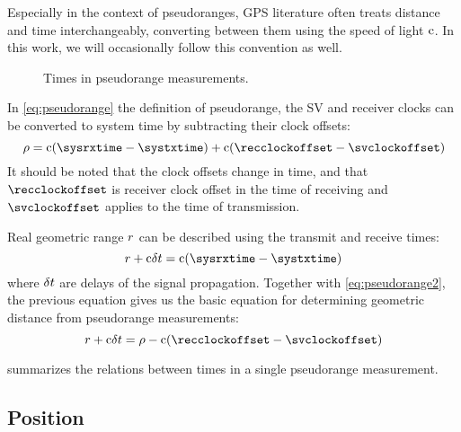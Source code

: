 Especially in the context of pseudoranges, GPS literature often treats distance and time
interchangeably, converting between them using the speed of light \(\mathrm{c}\).
In this work, we will occasionally follow this convention as well.

\begin{figure}[tb]
	\centering
	
	\caption{Times in pseudorange measurements.}
	\label{fig:pseudorange}
\end{figure}

In \eqref{eq:pseudorange} the definition of pseudorange, the SV and receiver clocks can be
converted to system time by subtracting their clock offsets:
\begin{equation}
	\label{eq:pseudorange2}
	\rho = \speedoflight (\sysrxtime - \systxtime) + \speedoflight (\recclockoffset - \svclockoffset)
\end{equation}
It should be noted that the clock offsets change in time, and that \(\recclockoffset\) is receiver clock
offset in the time of receiving and \(\svclockoffset\) applies to the time of transmission.

Real geometric range \(r\) can be described using the transmit and receive times:
\begin{equation}
	\geomrange + \speedoflight\geomrangedelays = \speedoflight (\sysrxtime - \systxtime)
\end{equation}
where \(\delta{t}\) are delays of the signal propagation.
Together with \eqref{eq:pseudorange2}, the previous equation gives us
the basic equation for determining geometric distance from pseudorange measurements:
\begin{equation}
	\geomrange + \speedoflight\geomrangedelays = \rho - \speedoflight (\recclockoffset - \svclockoffset)
\end{equation}


 summarizes the relations between times in a single pseudorange measurement.

\subsection{Position}
\label{sec:gps-position}

